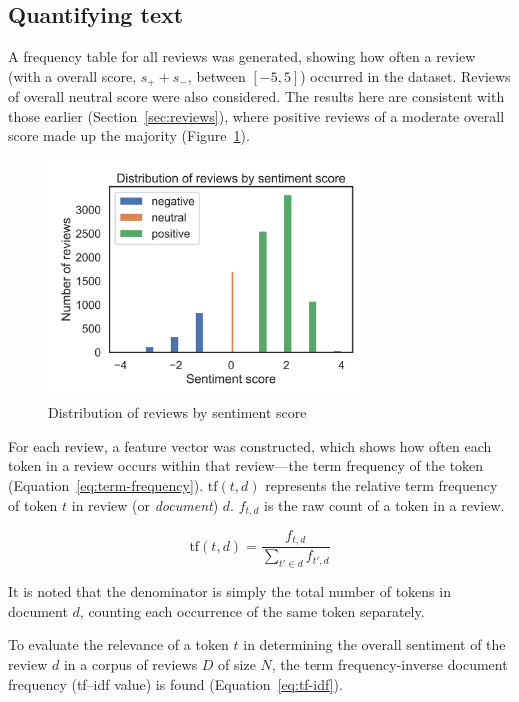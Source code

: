 \documentclass[11pt, a4paper]{pancake-article}
\begin{document}
\subsection{Quantifying text}

A frequency table for all reviews was generated, showing how
often a review (with a overall score, \(s_+ + s_-\), between \(\left[-5, 5\right]\))
occurred in the dataset. Reviews of overall neutral score were also considered.
The results here are consistent with those earlier (Section~\ref{sec:reviews}),
where positive reviews of a moderate overall score made up the majority (Figure~\ref{fig:distribution}).

\begin{figure}[htpb]
	\centering
	\includegraphics[width=0.75\textwidth]{../results/old/distribution.png}
	\caption{Distribution of reviews by sentiment score}
	\label{fig:distribution}
\end{figure}

For each review, a feature vector was constructed, which shows how
often each token in a review occurs within that review---the term frequency
of the token (Equation~\ref{eq:term-frequency}). \(\text{tf}\left(t, d\right)\)
represents the relative term frequency of token \(t\) in review (or \textit{document})
\(d\). \(f_{t, d}\) is the raw count of a token in a review.

\begin{equation}
	\text{tf}\left(t, d\right) = \frac{f_{t, d}}{\sum_{t' \in d}^{}f_{t',d}}
	\label{eq:term-frequency}
\end{equation}

It is noted that the denominator is simply the total number of tokens in document \(d\),
counting each occurrence of the same token separately.

To evaluate the relevance of a token \(t\) in determining the overall sentiment of the
review \(d\) in a corpus of reviews \(D\) of size \(N\), the term frequency-inverse document frequency
(tf--idf value) is found (Equation~\ref{eq:tf-idf}).
\end{document}
